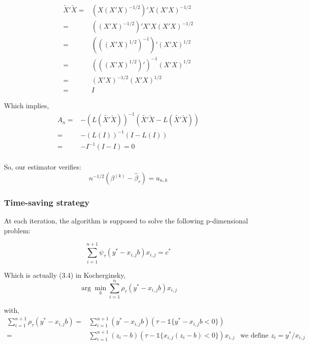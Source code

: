\documentclass[11pt]{article}
\begin{document}
\begin{align*}
\tilde{X}'\tilde{X} = & \left(X(X'X)^{-1/2}\right)'X(X'X)^{-1/2}\\
= &  \left((X'X)^{-1/2}\right)'X'X(X'X)^{-1/2}\\
= &  \left(((X'X)^{1/2})^{-1}\right)'(X'X)^{1/2}\\
= &  \left(((X'X)^{1/2})'\right)^{-1}(X'X)^{1/2}\\ %
= &  (X'X)^{-1/2}(X'X)^{1/2}\\
= & I
\end{align*}

Which implies,
\begin{align*}
A_{n} = &-\left(L(\tilde{X'}\tilde{X})\right)^{-1}\left(\tilde{X'}\tilde{X}-L(\tilde{X'}\tilde{X})\right)\\
= & -\left(L( I )\right)^{-1} \left( I -L( I) \right)\\
= & -I^{-1} \left( I -I \right) = 0\\
\end{align*}

So, our estimator verifies:
\begin{equation}
n^{-1/2}(\beta^{(k)}-\hat{\beta}_{\tau}) = u_{n,k}
\end{equation}



	\subsubsection{Time-saving strategy}
At each iteration, the algorithm is supposed to solve the following p-dimensional problem:

\begin{equation}
\sum_{i=1}^{n+1}\psi_{\tau}(y^{*}-x_{i,j}b)x_{i,j} = c^{*}
\end{equation}

Which is actually (3.4) in Kocherginsky,
\begin{equation}
\arg\min_{b}\sum_{i=1}^{n}\rho_{\tau}(y^{*}-x_{i,j}b)x_{i,j}
\end{equation}

with,
\begin{align*}
\sum_{i=1}^{n+1}\rho_{\tau}(y^{*}-x_{i,j}b)=&\sum_{i=1}^{n+1} (y^{*}-x_{i,j}b)(\tau-\mathds{1}\{y^{*}-x_{i,j}b<0\})\\
= & \sum_{i=1}^{n+1} (z_{i}-b)(\tau-\mathds{1}\{x_{i,j}(z_{i}-b)<0\}) x_{i,j} & \text{we define } z_{i}=y^{*}/x_{i,j}\\
\end{align*}
\end{document}
